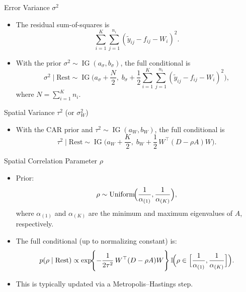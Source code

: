 \begin{frame}{Error Variance \(\sigma^2\)}
  \begin{itemize}
    \item The residual sum-of-squares is
      \[
      \sum_{i=1}^K\sum_{j=1}^{n_i} (\tilde{y}_{ij}-f_{ij}-W_i)^2.
      \]
    \item With the prior \(\sigma^2 \sim \operatorname{IG}(a_\sigma,b_\sigma)\), the full conditional is
      \[
      \sigma^2\mid \text{Rest} \sim \operatorname{IG}\!\Biggl(a_\sigma+\frac{N}{2},\; b_\sigma+\frac{1}{2}\sum_{i=1}^{K}\sum_{j=1}^{n_i} (\tilde{y}_{ij}-f_{ij}-W_i)^2\Biggr),
      \]
      where \(N=\sum_{i=1}^K n_i\).
  \end{itemize}
\end{frame}

\begin{frame}{Spatial Variance \(\tau^2\) (or \(\sigma_W^2\))}
  \begin{itemize}
    \item With the CAR prior and \(\tau^2 \sim \operatorname{IG}(a_W,b_W)\), the full conditional is
      \[
      \tau^2\mid \text{Rest} \sim \operatorname{IG}\!\Biggl(a_W+\frac{K}{2},\; b_W+\frac{1}{2}\,W^\top (D-\rho A) W\Biggr).
      \]
  \end{itemize}
\end{frame}

\begin{frame}{Spatial Correlation Parameter \(\rho\)}
  \begin{itemize}
    \item Prior:
      \[
      \rho \sim \operatorname{Uniform}\!\Bigl(\frac{1}{\alpha_{(1)}},\frac{1}{\alpha_{(K)}}\Bigr),
      \]
      where \(\alpha_{(1)}\) and \(\alpha_{(K)}\) are the minimum and maximum eigenvalues of \(A\), respectively.
    \item The full conditional (up to normalizing constant) is:
      \[
      p(\rho\mid \text{Rest}) \propto \exp\!\Biggl\{-\frac{1}{2\tau^2}\,W^\top (D-\rho A)W\Biggr\}\,
      \mathbb{I}\!\Bigl(\rho\in\Bigl[\frac{1}{\alpha_{(1)}},\frac{1}{\alpha_{(K)}}\Bigr]\Bigr).
      \]
    \item This is typically updated via a Metropolis--Hastings step.
  \end{itemize}
\end{frame}

